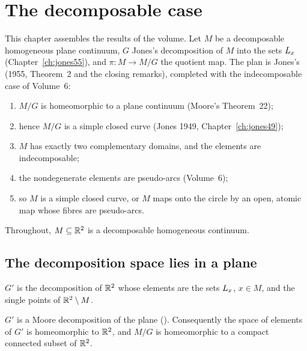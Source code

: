 \chapter{The decomposable case}\label{ch:decomposable}

This chapter assembles the results of the volume. Let $M$ be a decomposable homogeneous plane continuum, $G$ Jones's
decomposition of $M$ into the sets $L_{x}$ (Chapter~\ref{ch:jones55}), and $\pi\colon M\to M/G$ the quotient map. The plan is
Jones's (1955, Theorem~2 and the closing remarks), completed with the indecomposable case of Volume~6:
\begin{enumerate}
\item $M/G$ is homeomorphic to a plane continuum (Moore's Theorem~22);
\item hence $M/G$ is a simple closed curve (Jones 1949, Chapter~\ref{ch:jones49});
\item $M$ has exactly two complementary domains, and the elements are indecomposable;
\item the nondegenerate elements are pseudo-arcs (Volume~6);
\item so $M$ is a simple closed curve, or $M$ maps onto the circle by an open, atomic map whose fibres are pseudo-arcs.
\end{enumerate}

Throughout, $M\subseteq\mathbb{R}^2$ is a decomposable homogeneous continuum.

\section{The decomposition space lies in a plane}

\begin{definition}\label{def:gprime}
$G'$ is the decomposition of $\mathbb{R}^2$ whose elements are the sets $L_{x}$, $x\in M$, and the single points of $\mathbb{R}^2\setminus M$.
\end{definition}


\begin{proposition}[Jones 1955, p.~739]\label{prop:gprime}
$G'$ is a Moore decomposition of the plane (). Consequently the space of elements of $G'$ is homeomorphic to $\mathbb{R}^2$,
and $M/G$ is homeomorphic to a compact connected subset of $\mathbb{R}^2$.
\end{proposition}


